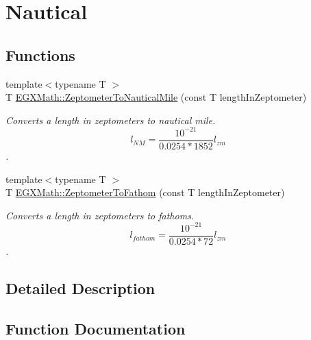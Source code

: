 \hypertarget{group___e_g_x_math-_conversions-_length_conversions-_s_i-_zeptometer-_nautical}{}\section{Nautical}
\label{group___e_g_x_math-_conversions-_length_conversions-_s_i-_zeptometer-_nautical}
\subsection*{Functions}
\begin{DoxyCompactItemize}
\item 
{\footnotesize template$<$typename T $>$ }\\T \mbox{\hyperlink{group___e_g_x_math-_conversions-_length_conversions-_s_i-_zeptometer-_nautical_ga9d6a1de6b4a8de39ba16da0a17cdca42}{E\+G\+X\+Math\+::\+Zeptometer\+To\+Nautical\+Mile}} (const T length\+In\+Zeptometer)
\begin{DoxyCompactList}\small\item\em Converts a length in zeptometers to nautical mile. \[ l_{NM}= \frac{10^{-21}}{0.0254 * 1852} l_{zm} \]. \end{DoxyCompactList}\item 
{\footnotesize template$<$typename T $>$ }\\T \mbox{\hyperlink{group___e_g_x_math-_conversions-_length_conversions-_s_i-_zeptometer-_nautical_ga338ca94378cf11aca399ecdfc859950a}{E\+G\+X\+Math\+::\+Zeptometer\+To\+Fathom}} (const T length\+In\+Zeptometer)
\begin{DoxyCompactList}\small\item\em Converts a length in zeptometers to fathoms. \[ l_{fathom}= \frac{10^{-21}}{0.0254 * 72} l_{zm} \]. \end{DoxyCompactList}\end{DoxyCompactItemize}


\subsection{Detailed Description}


\subsection{Function Documentation}
\mbox{\label{group___e_g_x_math-_conversions-_length_conversions-_s_i-_zeptometer-_nautical_ga338ca94378cf11aca399ecdfc859950a}} 
